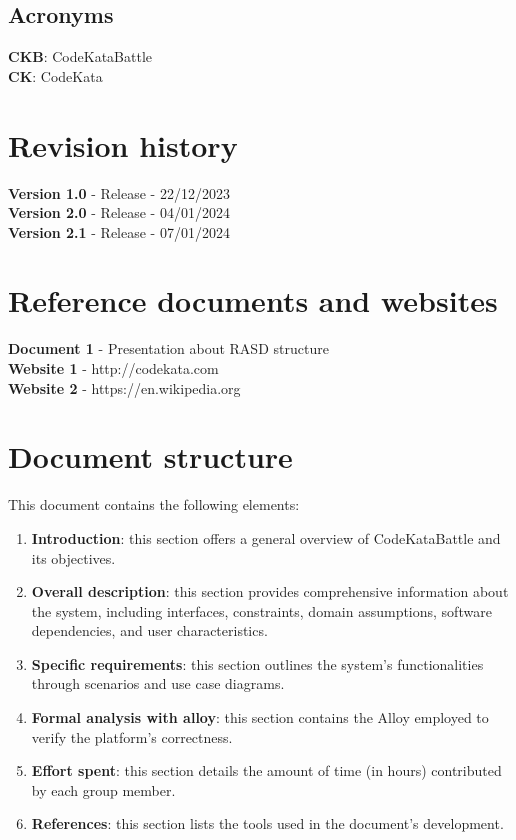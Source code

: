 \documentclass[12pt, a4paper]{report}
\begin{document}
    \subsection{Acronyms}
    \textbf{CKB}: CodeKataBattle \\
    \textbf{CK}: CodeKata
    
    \section{Revision history}
    \textbf{Version 1.0} - Release - 22/12/2023 \\
    \textbf{Version 2.0} - Release - 04/01/2024 \\
    \textbf{Version 2.1} - Release - 07/01/2024

    \section{Reference documents and websites}
    \textbf{Document 1} - Presentation about RASD structure \\
    \textbf{Website 1} - http://codekata.com \\
    \textbf{Website 2} - https://en.wikipedia.org

    \section{Document structure}
    This document contains the following elements: 
    \begin{enumerate}
        \item \textbf{Introduction}: this section offers a general overview of CodeKataBattle and its objectives.
        \item \textbf{Overall description}: this section provides comprehensive information about the system, including interfaces, constraints, domain assumptions, software dependencies, and user characteristics.
        \item \textbf{Specific requirements}: this section outlines the system's functionalities through scenarios and use case diagrams.
        \item \textbf{Formal analysis with alloy}: this section contains the Alloy employed to verify the platform's correctness.
        \item \textbf{Effort spent}: this section details the amount of time (in hours) contributed by each group member.
        \item \textbf{References}: this section lists the tools used in the document's development.
    \end{enumerate}
\end{document}

